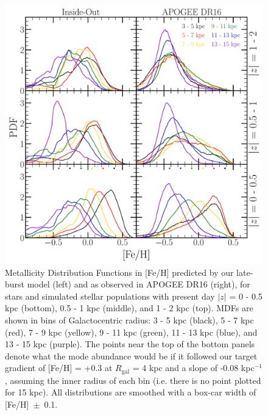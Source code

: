 \documentclass[fleqn, usenatbib]{mnras}
\begin{document}
\begin{figure} 
\centering 
\includegraphics[scale = 0.34]{mdf_3panel_fe.pdf} 
\caption{Metallicity Distribution Functions in [Fe/H] predicted by our 
late-burst model (left) and as observed in APOGEE DR16 (right), for stars and 
simulated stellar populations with present day $\left|z\right|$ = 0 - 0.5 kpc 
(bottom), 0.5 - 1 kpc (middle), and 1 - 2 kpc (top). MDFs are shown in bins 
of Galactocentric radius: 3 - 5 kpc (black), 5 - 7 kpc (red), 7 - 9 kpc 
(yellow), 9 - 11 kpc (green), 11 - 13 kpc (blue), and 13 - 15 kpc (purple). 
The points near the top of the bottom panels denote what the mode abundance 
would be if it followed our target gradient of [Fe/H] = +0.3 at $R_\text{gal}$ 
= 4 kpc and a slope of -0.08 kpc$^{-1}$, assuming the inner radius of each bin 
(i.e. there is no point plotted for 15 kpc). All distributions are smoothed 
with a box-car width of [Fe/H]~$\pm$~0.1. } 
\label{fig:mdf_3panel_fe} 
\end{figure} 
\end{document}
